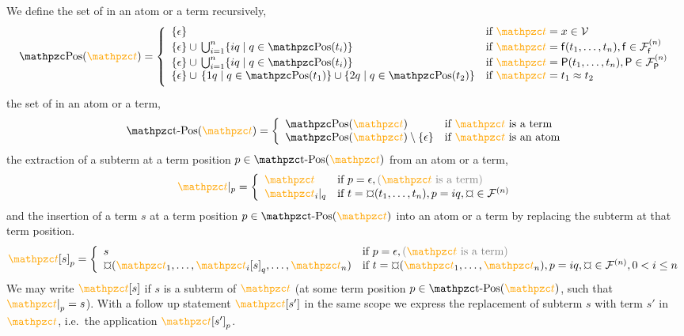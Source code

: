 \begin{definition}

	We define the set of  in an atom or a term recursively,
	\begin{gather*}
	\MDEFINE{\pos(\foxt) }{ll}{
		\{ \epsilon \}
		& \text{if }\foxt = x \in \mcV
		\\
		\{ \epsilon \} \cup \, \bigcup_{i=1}^{n} \{ iq\mid q\in\pos(t_i) \}
		&	\text{if }\foxt=\mf(t_1,\ldots,t_n), \mf\in\mcFfn
		\\
		\{ \epsilon \} \cup \, \bigcup_{i=1}^{n} \{ iq\mid q\in\pos(t_i) \}
		&	\text{if } \foxt=\mP(t_1,\ldots,t_n), \mP\in\mcFPn
		\\
		\{ \epsilon \} \cup \, \{ 1q\mid q\in\pos(t_1) \} \cup \{ 2q\mid q\in\pos(t_2) \}
		&	\text{if } \foxt=t_1\mEQ t_2
		\\[0.5em]
	}
	\end{gather*}
	the set of  in an atom or a term,
	\begin{gather*}
	\MDEFINE{\posT(\foxt)}{ll}{
		\pos(\foxt)
		& \text{if }\foxt\text{ is a term}
		\\
		\pos(\foxt) \setminus \{ \epsilon \}
		& \text{if }\foxt\text{ is an atom}
	}
	\end{gather*}
	the extraction of a subterm at a term position \( p\in\posT(\foxt) \) from an atom or a term,
%
\begin{gather*}
	\MDEFINE{\foxt|_p}{ll}{
		\foxt 		& \text{if }p=\epsilon, \colG(\foxt\text{ is a term}) \\
		\foxt_i|_q	& \text{if }t=\Pf(t_1,\ldots,t_n), p=iq, \Pf\in\mcFn
	}
\end{gather*}
	and the insertion of a term \( s \) at a term position \( p\in\posT(\foxt) \) into an atom or a term
	by replacing the subterm at that term position.
	\begin{gather*}
	\MDEFINE{\foxt{[s]}_p}{ll}{
		s
		& \text{if }p=\epsilon, \colG(\foxt\text{ is a term})
		\\
		\Pf(\foxt_1,\ldots,\foxt_i{[s]}_q,\ldots,\foxt_n)
		& \text{if }t=\Pf(\foxt_1,\ldots,\foxt_n), p=iq,
		\Pf\in\mcFn, 0 < i \leq n
	}
	\end{gather*}
	We may write \( \foxt[s] \) if \( s \) is a subterm of \( \foxt \)
	(at some term position \( p\in\posT(\foxt) \), such that \( {\foxt|}_p = s \)).
	With a follow up statement \( \foxt[s'] \) in the same scope we express
	the replacement of subterm \( s \) with term \( s' \) in \( \foxt \), i.e.~the application \( {\foxt[s']}_p \).
\end{definition}